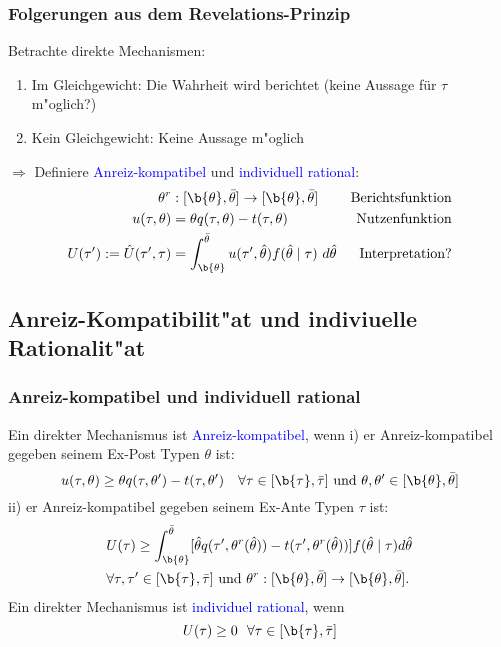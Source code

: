 \begin{frame}
  \frametitle{Folgerungen aus dem Revelations-Prinzip}
  \justifying
  Betrachte direkte Mechanismen:
  \begin{enumerate}
    \item Im Gleichgewicht: Die Wahrheit wird berichtet (keine Aussage für $\tau$ m"oglich?)
    \item Kein Gleichgewicht: Keine Aussage m"oglich
  \end{enumerate}
  $\Rightarrow$ Definiere \textcolor{blue}{Anreiz-kompatibel} und \textcolor{blue}{individuell rational}: \\
  \begin{align*}
    \theta^{r} &: [ \b{\theta} , \bar{\theta} ] \rightarrow [ \b{\theta} , \bar{\theta} ] &\text{Berichtsfunktion} \\
    u( \tau, \theta) &= \theta q( \tau, \theta) - t(\tau, \theta) &\text{Nutzenfunktion} \\
    U( \tau') := \hat{U}( \tau', \tau) &= \int_{\b{\theta}}^{\bar{\theta}} u( \tau', \hat{\theta}) f(\hat{\theta} \mid \tau) \ d \hat{\theta} & \text{Interpretation?}\\
  \end{align*}
\end{frame}

\subsection{Anreiz-Kompatibilit"at und indiviuelle Rationalit"at}
\begin{frame}
  \frametitle{Anreiz-kompatibel und individuell rational}
  \justifying
  \begin{thmD}
    Ein direkter Mechanismus ist \textcolor{blue}{Anreiz-kompatibel}, wenn \newline
    i) er Anreiz-kompatibel gegeben seinem Ex-Post Typen $\theta$ ist:
    \begin{equation*}
      u( \tau, \theta) \ge \theta q( \tau, \theta') - t( \tau, \theta') \quad \forall \tau \in [ \b{\tau} , \bar{\tau} ] \ \text{und} \ \theta, \theta' \in [ \b{\theta} , \bar{\theta} ]
    \end{equation*}
    ii) er Anreiz-kompatibel gegeben seinem Ex-Ante Typen $\tau$ ist:
    \begin{align*}
      &U(\tau) \ge \int_{\b{\theta}}^{\bar{\theta}} [ \hat{\theta} q(\tau', \theta^{r}(\hat{\theta})) - t( \tau', \theta^{r}(\hat{\theta})) ] f(\hat{\theta} \mid \tau) d \hat{\theta}  \\
      &\forall \tau, \tau' \in [ \b{\tau} , \bar{\tau} ] \ \text{und} \ \theta^{r}:[ \b{\theta} , \bar{\theta} ] \rightarrow [ \b{\theta} , \bar{\theta} ].
    \end{align*}
    Ein direkter Mechanismus ist \textcolor{blue}{individuel rational}, wenn
    \begin{equation*}
      U(\tau) \ge 0 \ \ \forall \tau \in [ \b{\tau} , \bar{\tau} ]
    \end{equation*}
  \end{thmD}

\end{frame}

